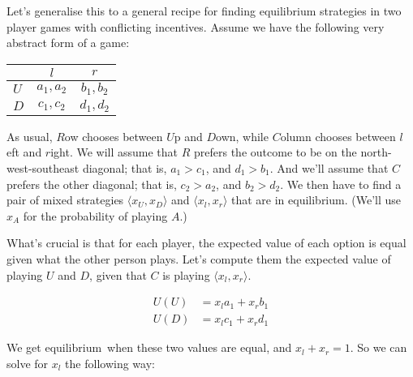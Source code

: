 \documentclass[11pt,]{article}
\begin{document}
Let's generalise this to a general recipe for finding equilibrium
strategies in two player games with conflicting incentives. Assume we
have the following very abstract form of a game:

\begin{longtable}[]{@{}lcc@{}}
\toprule
& \(l\) & \(r\)\tabularnewline
\midrule
\endhead
\(U\) & \(a_1, a_2\) & \(b_1, b_2\)\tabularnewline
\(D\) & \(c_1, c_2\) & \(d_1, d_2\)\tabularnewline
\bottomrule
\end{longtable}

As usual, \(R\)ow chooses between \(U\)p and \(D\)own, while \(C\)olumn
chooses between \(l\)eft and \(r\)ight. We will assume that \(R\)
prefers the outcome to be on the north-west-southeast diagonal; that is,
\(a_1 > c_1\), and \(d_1 > b_1\). And we'll assume that \(C\) prefers
the other diagonal; that is, \(c_2 > a_2\), and \(b_2 > d_2\). We then
have to find a pair of mixed strategies \(\langle x_U, x_D \rangle\) and
\(\langle x_l, x_r \rangle\) that are in equilibrium. (We'll use \(x_A\)
for the probability of playing \(A\).)

What's crucial is that for each player, the expected value of each
option is equal given what the other person plays. Let's compute them
the expected value of playing \(U\) and \(D\), given that \(C\) is
playing \(\langle x_l, x_r \rangle\).

\begin{align*}
U(U) &= x_la_1 + x_rb_1 \\
U(D) &= x_lc_1 + x_rd_1
\end{align*}

We get equilibrium~when these two values are equal, and
\(x_l + x_r = 1\). So we can solve for \(x_l\) the following way:
\end{document}
